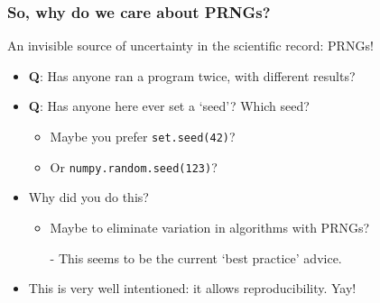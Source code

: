 \documentclass[12pt]{beamer}
\begin{document}
\begin{frame}
\frametitle{So, why do we care about PRNGs?}
An invisible source of uncertainty in the scientific record: PRNGs! \\ \vspace{.075in} \pause
	\begin{itemize}
		\item \textbf{Q}: Has anyone ran a program twice, with different results?\\ \vspace{.075in}\pause
		\item \textbf{Q}: Has anyone here ever set a `\color{myblue}seed\color{black}'? Which seed?\\  \vspace{.075in}\pause
			\begin{itemize}
				\item Maybe you prefer \texttt{set.seed(42)}? \vspace{.075in}\pause
				\item Or \texttt{numpy.random.seed(123)}?\vspace{.075in}\pause
				\end{itemize}
		\item Why did you do this?\vspace{.075in}\pause
		\begin{itemize}
			\item Maybe to eliminate variation in algorithms with PRNGs?\\ \vspace{.075in}\pause
		\item[-] This seems to be the current `best practice' advice.\\ \vspace{.075in}\pause
		\end{itemize}
		\item This is very well intentioned: it allows reproducibility. Yay!
	\end{itemize}
\end{frame}
\end{document}
